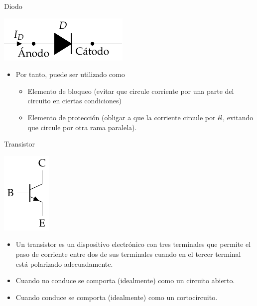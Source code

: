 \documentclass[xcolor={usenames,svgnames,dvipsnames}]{beamer}
\begin{document}
\begin{frame}[label={sec:orgdeb0bdf}]{Diodo}
\begin{center}
\includegraphics[height=0.15\textheight]{figs/Diodo.pdf}
\end{center}

\begin{itemize}
\item Por tanto, puede ser utilizado como

\begin{itemize}
\item \alert{Elemento de bloqueo} (evitar que circule corriente por una parte
del circuito en ciertas condiciones)

\item \alert{Elemento de protección} (obligar a que la corriente circule por
él, evitando que circule por otra rama paralela).
\end{itemize}
\end{itemize}
\end{frame}

\begin{frame}[label={sec:org451d04f}]{Transistor}
\begin{center}
\includegraphics[height=0.3\textheight]{figs/Transistor.pdf}
\end{center}

\begin{itemize}
\item Un transistor es un dispositivo electrónico con tres terminales que
permite el paso de corriente entre dos de sus terminales cuando en el
tercer terminal está polarizado adecuadamente.

\item Cuando \alert{no conduce} se comporta (idealmente) como un \alert{circuito abierto}.

\item Cuando \alert{conduce} se comporta (idealmente) como un \alert{cortocircuito}.
\end{itemize}
\end{frame}
\end{document}
